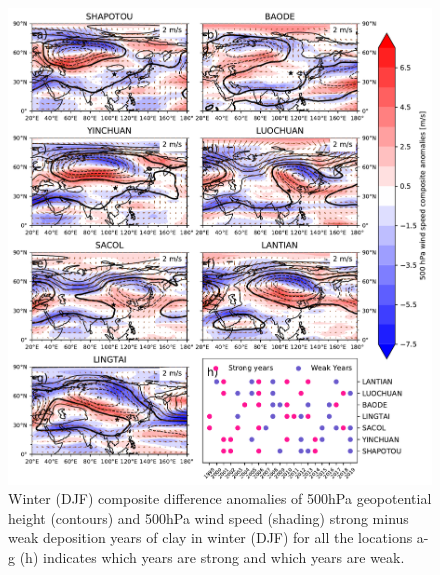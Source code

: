 \begin{figure}[hptb]
    \centering
    \includegraphics[width=\columnwidth]{texfiles/figs/geopot_ws_500hPa_2micron_DJF.pdf}
    \caption{Winter (DJF) composite difference anomalies of 500hPa geopotential height (contours) and 500hPa wind speed (shading) strong minus weak deposition years of clay in winter (DJF) for all the locations a-g  (h) indicates which years are strong and which years are weak.}
    \label{fig:DJF_500hPa_fine_composite}
\end{figure}

